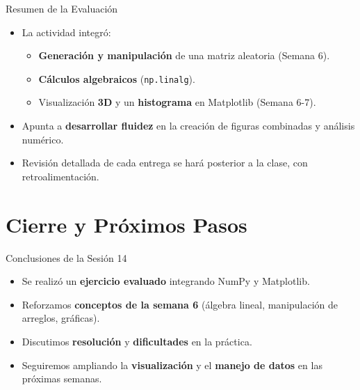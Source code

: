 \documentclass[10pt]{beamer}
\begin{document}
\begin{frame}{Resumen de la Evaluación}
  \begin{itemize}
    \item La actividad integró:
      \begin{itemize}
        \item \textbf{Generación y manipulación} de una matriz aleatoria (Semana 6).
        \item \textbf{Cálculos algebraicos} (\texttt{np.linalg}).
        \item Visualización \textbf{3D} y un \textbf{histograma} en Matplotlib (Semana 6-7).
      \end{itemize}
    \item Apunta a \textbf{desarrollar fluidez} en la creación de figuras combinadas y análisis numérico.
    \item Revisión detallada de cada entrega se hará posterior a la clase, con retroalimentación.
  \end{itemize}
\end{frame}

\section{Cierre y Próximos Pasos}

\begin{frame}{Conclusiones de la Sesión 14}
  \begin{itemize}
    \item Se realizó un \textbf{ejercicio evaluado} integrando NumPy y Matplotlib.
    \item Reforzamos \textbf{conceptos de la semana 6} (álgebra lineal, manipulación de arreglos, gráficas).
    \item Discutimos \textbf{resolución} y \textbf{dificultades} en la práctica.
    \item Seguiremos ampliando la \textbf{visualización} y el \textbf{manejo de datos} en las próximas semanas.
  \end{itemize}
\end{frame}
\end{document}
